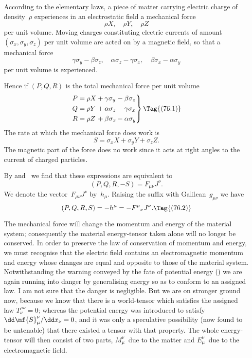 \documentclass[12pt]{book}
\begin{document}

According to the elementary laws, a piece of matter carrying electric
charge of density~$\rho$ experiences in an electrostatic field a mechanical force
\[
\rho X,\quad \rho Y,\quad \rho Z
\]
per unit volume. Moving charges constituting electric currents of amount
$(\sigma_{x}, \sigma_{y}, \sigma_{z})$ per unit volume are acted on by a magnetic field, so that a
mechanical force
\[
\gamma\sigma_{y} - \beta\sigma_{z},\quad
\alpha\sigma_{z} - \gamma\sigma_{x},\quad
\beta\sigma_{x} - \alpha\sigma_{y}
\]
per unit volume is experienced.

Hence if $(P, Q, R)$ is the total mechanical force per unit volume
\[
\left.
\begin{alignedat}{3}
P &= \rho X &&+ \gamma \sigma_{y} &&- \beta \sigma_{z}\\
Q &= \rho Y &&+ \alpha \sigma_{z} &&- \gamma\sigma_{x}\\
R &= \rho Z &&+ \beta  \sigma_{x} &&- \alpha\sigma_{y}
\end{alignedat}
\right\}
\Tag{(76.1)}
\]
The rate at which the mechanical force does work is
\[
S = \sigma_{x} X + \sigma_{y} Y + \sigma_{z} Z.
\]
The magnetic part of the force does no work since it acts at right angles to
the current of charged particles.

By  and~ we find that these expressions are equivalent to
%
\[
(P, Q, R, -S) = F_{\mu\nu} J^{\nu}.
\]
We denote the vector~$F_{\mu\nu} J^{\nu}$ by~$h_{\mu}$. Raising the suffix with Galilean~$g_{\mu\nu}$ we
have
\[
(P, Q, R, S) = -h^{\mu} = -{F^{\mu}}_{\nu} J^{\nu}.
\Tag{(76.2)}
\]

The mechanical force will change the momentum and energy of the
material system; consequently the material energy\hyp{}tensor taken alone will
%
no longer be conserved. In order to preserve the law of conservation of
momentum and energy, we must recognise that the electric field contains an
electromagnetic momentum and energy whose changes are equal and opposite
%
to those of the material system\footnotemark.\footnotetext
  {Notwithstanding the warning conveyed by the fate of potential energy () we are again
  running into danger by generalising energy so as to conform to an assigned law. I am not sure
  that the danger is negligible. But we are on stronger ground now, because we know that there is a
  world\hyp{}tensor which satisfies the assigned law $T_{\nu}^{\mu\nu} = 0$; whereas the potential energy was introduced
  to satisfy $\dd\mf{S}_{\mu}^{\nu}/\dd x_{\nu} = 0$, and it was only a speculative possibility (now found to be untenable) that
  there existed a tensor with that property.}
The whole energy\hyp{}tensor will then consist
of two parts, $M_{\mu}^{\nu}$~due to the matter and $E_{\mu}^{\nu}$~due to the electromagnetic field.
\end{document}
